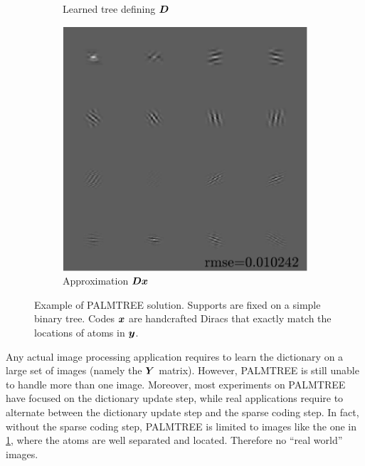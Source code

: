 \begin{figure}[!h]
\begin{subfigure}[b]{0.325\textwidth}
	\caption{Learned tree defining $\bm{D}$}
\end{subfigure}
\begin{subfigure}[b]{0.325\textwidth}\centering
\includegraphics[width=1\textwidth]{figures/tree-learn/xp_learnsupp256_curvelet_decomp3[tree-binary_dpth4]_supp-generic3x3_[fixed-supports]_approx.pdf}
	\caption{Approximation $\bm{D}\bm{x}$}
\end{subfigure}
\caption{Example of PALMTREE solution. Supports are fixed on a simple binary tree. Codes $\bm{x}$ are handcrafted Diracs that exactly match the locations of atoms in $\bm{y}$.}\label{fig_exple_fixed_tree}
\end{figure}

Any actual image processing application requires to learn the dictionary on a large set of images (namely the $\bm{Y}$ matrix). However, \ac{PALMTREE} is still unable to handle more than one image. Moreover, most experiments on \ac{PALMTREE} have focused on the dictionary update step, while real applications require to alternate between the dictionary update step and the sparse coding step. In fact, without the sparse coding step, \ac{PALMTREE} is limited to images like the one in \cref{fig_exple_fixed_tree}, where the atoms are well separated and located. Therefore no “real world” images.

\FloatBarrier

